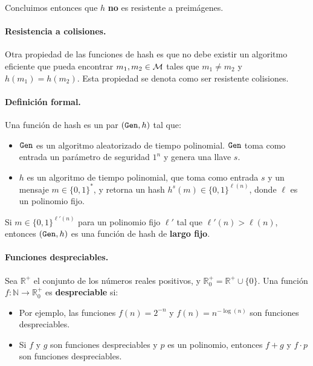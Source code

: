 Concluimos entonces que $h$ \textbf{no} es resistente a preimágenes.

\paragraph{Resistencia a colisiones.} Otra propiedad de las funciones de hash es que no debe existir un algoritmo eficiente que pueda encontrar $m_1, m_2 \in \mathcal{M}$ tales que $m_1 \neq m_2$ y $h(m_1) = h(m_2)$. Esta propiedad se denota como ser resistente colisiones.

\paragraph{Definición formal.} Una función de hash es un par $(\texttt{Gen}, h)$ tal que:
\begin{itemize}
    \item $\texttt{Gen}$ es un algoritmo aleatorizado de tiempo polinomial. $\texttt{Gen}$ toma como entrada un parámetro de seguridad $1^n$ y genera una llave $s$.
    \item $h$ es un algoritmo de tiempo polinomial, que toma como entrada $s$ y un mensaje $m \in \{0,1\}^*$, y retorna un hash $h^s(m) \in \{0,1\}^{\ell(n)}$, donde $\ell$ es un polinomio fijo.
\end{itemize}

Si $m \in \{0,1\}^{\ell'(n)}$ para un polinomio fijo $\ell'$ tal que $\ell'(n) > \ell(n)$, entonces $(\texttt{Gen}, h)$ es una función de hash de \textbf{largo fijo}.

\paragraph{Funciones despreciables.} Sea $\mathbb{R}^+$ el conjunto de los números reales positivos, y $\mathbb{R}_0^+ = \mathbb{R}^+ \cup \{0\}$. Una función $f: \mathbb{N} \to \mathbb{R}_0^+$ es \textbf{despreciable} si:
\begin{itemize}
    \item Por ejemplo, las funciones $f(n) = 2^{-n}$ y $f(n) = n^{-\log(n)}$ son funciones despreciables.
    \item Si $f$ y $g$ son funciones despreciables y $p$ es un polinomio, entonces $f + g$ y $f \cdot p$ son funciones despreciables.
\end{itemize}

